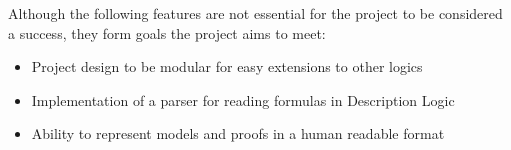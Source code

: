
Although the following features are not essential for the project to be considered a success, they
form goals the project aims to meet:

\begin{itemize}
\item Project design to be modular for easy extensions to other logics
\item Implementation of a parser for reading formulas in Description Logic
\item Ability to represent models and proofs in a human readable format
\end{itemize}

